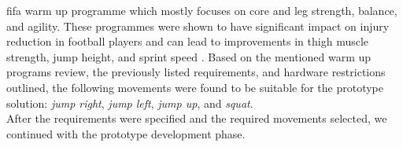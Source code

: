 \gls{fifa} \cite{fifa} warm up programme which mostly focuses on core and leg strength, balance, and agility. These programmes were shown to have significant impact on injury reduction in football players and can lead to improvements in thigh muscle strength, jump height, and sprint speed \cite{silvers2015efficacy}. %
Based on the mentioned warm up programs review, the previously listed requirements, and hardware restrictions outlined, the following movements were found to be suitable for the prototype solution: \textit{jump right}, \textit{jump left}, \textit{jump up}, and \textit{squat}.\\
After the requirements were specified and the required movements selected, we continued with the prototype development phase.
